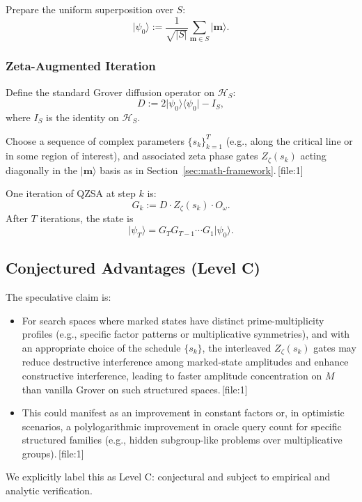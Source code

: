 \documentclass[11pt]{article}
\begin{document}
Prepare the uniform superposition over \(S\):
\[
\lvert \psi_0 \rangle := \frac{1}{\sqrt{|S|}} \sum_{\mathbf{m} \in S} \lvert \mathbf{m} \rangle.
\]

\subsubsection{Zeta-Augmented Iteration}

Define the standard Grover diffusion operator on \(\mathcal{H}_S\):
\[
D := 2 \lvert \psi_0 \rangle \langle \psi_0 \rvert - I_S,
\]
where \(I_S\) is the identity on \(\mathcal{H}_S\).

Choose a sequence of complex parameters \(\{ s_k \}_{k=1}^T\) (e.g., along the critical line or in some region of interest), and associated zeta phase gates \(Z_\zeta(s_k)\) acting diagonally in the \(\lvert \mathbf{m} \rangle\) basis as in Section~\ref{sec:math-framework}.\,[file:1]

One iteration of QZSA at step \(k\) is:
\[
G_k := D \cdot Z_\zeta(s_k) \cdot O_\omega.
\]
After \(T\) iterations, the state is
\[
\lvert \psi_T \rangle = G_T G_{T-1} \cdots G_1 \lvert \psi_0 \rangle.
\]

\subsection{Conjectured Advantages (Level C)}

The speculative claim is:

\begin{itemize}[leftmargin=*]
    \item For search spaces where marked states have distinct prime-multiplicity profiles (e.g., specific factor patterns or multiplicative symmetries), and with an appropriate choice of the schedule \(\{ s_k \}\), the interleaved \(Z_\zeta(s_k)\) gates may reduce destructive interference among marked-state amplitudes and enhance constructive interference, leading to faster amplitude concentration on \(M\) than vanilla Grover on such structured spaces.\,[file:1]
    \item This could manifest as an improvement in constant factors or, in optimistic scenarios, a polylogarithmic improvement in oracle query count for specific structured families (e.g., hidden subgroup-like problems over multiplicative groups).\,[file:1]
\end{itemize}

We explicitly label this as Level C: conjectural and subject to empirical and analytic verification.
\end{document}
